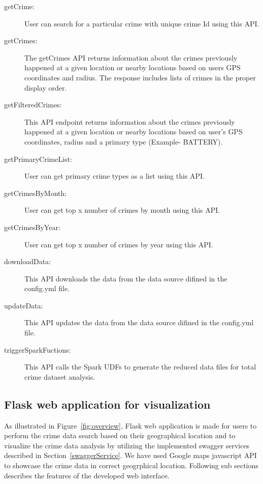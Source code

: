 \begin{description}
	\item[getCrime:] User can search for a particular crime with
	unique crime Id using this API.
        \item[getCrimes:] The
	getCrimes API returns information about the crimes previously
	happened at a given location or nearby locations based on
	users GPS coordinates and radius. The response includes lists
	of crimes in the proper display
	order.
        \item[getFilteredCrimes:] This API endpoint returns
	information about the crimes previously happened at a given
	location or nearby locations based on user’s GPS coordinates,
	radius and a primary type (Example-
	BATTERY).
        \item[getPrimaryCrimeList:] User can get primary
	crime types as a list using this
	API.
        \item[getCrimesByMonth:] User can get top x number of
	crimes by month using this API.
        \item[getCrimesByYear:] User
	can get top x number of crimes by year using this
	API.
        \item[downloadData:] This API downloads the data from
	the data source difined in the config.yml
	file.
        \item[updateData:] This API updates the data from the
	data source difined in the config.yml
	file.
        \item[triggerSparkFuctions:] This API calls the Spark
	UDFs to generate the reduced data files for total crime
	dataset analysis.
\end{description}

\subsection{Flask web application for visualization}\label{flaskWebApp}
As illustrated in Figure~\ref{fig:overview}, Flask web application is
made for users to perform the crime data search based on their
geographical location and to visualize the crime data analysis by
utilizing the implemented swagger services described in
Section~\ref{swaggerService}. We have used Google maps javascript API
to showcase the crime data in correct geogrphical location. Following
sub sections describes the features of the developed web interface.

